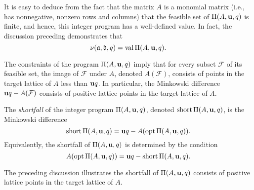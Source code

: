 \documentclass[11pt]{amsart}
\newcommand{\short}{\operatorname{short}}
\begin{document}
It is easy to deduce from the fact that the matrix $A$ is a monomial matrix (i.e., has nonnegative, nonzero rows and columns) that the feasible set of $\Pi(A,\mathbf{u},q)$ is finite, and hence, this integer program has a well-defined value.  In fact, the discussion preceding  demonstrates that 
%
\begin{equation}
\label{nu as program value: eq}
\nu(\mathfrak{a},\mathfrak{d},q) = \operatorname{val} \Pi(A,\mathbf{u},q).
\end{equation}


The constraints of the program $\Pi(A,\mathbf{u},q)$ imply that for every subset $\mathcal{F}$ of its feasible set,  the image of $\mathcal{F}$ under $A$, denoted $A(\mathcal{F})$, consists of points in the target lattice of $A$ less than $\mathbf{u}q$.  In particular, the Minkowski difference $\mathbf{u}q-A(\mathcal{F})$ consists of positive lattice points in the target lattice of $A$.

\begin{definition}[Shortfalls]  The \emph{shortfall} of the integer program $\Pi(A, \mathbf{u}, q)$, denoted $\short \IP(A, \vv{u}, q)$, is the Minkowski difference
%
\[ \short \IP(A, \vv{u}, q) = \vv{u}q - A( \opt \IP(A, \vv{u}, q)).\]  
Equivalently, the shortfall of $\Pi(A, \mathbf{u},q)$ is determined by the condition
\[ A(\opt \IP(A, \vv{u}, q)) = \vv{u}q - \short \IP(A, \vv{u}, q).\]
%

%
The preceding discussion illustrates the shortfall of $\Pi(A, \mathbf{u}, q)$ consists of positive lattice points in the target lattice of $A$.\end{definition}
\end{document}

